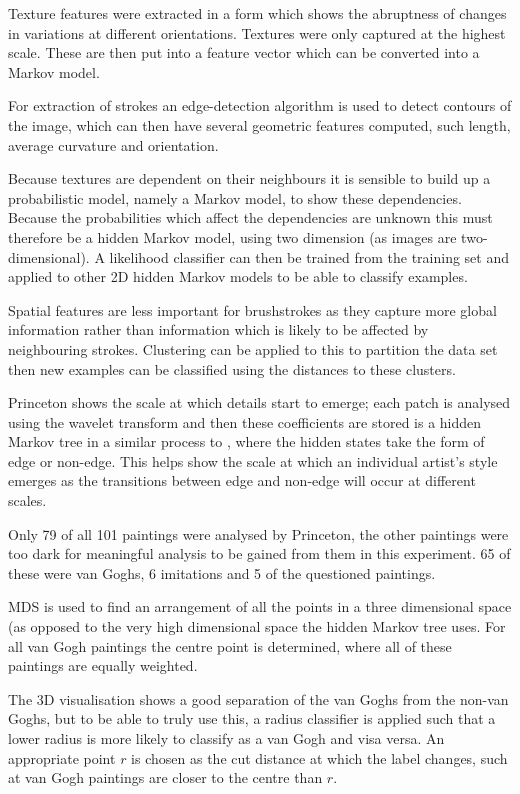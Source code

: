 \documentclass[conference]{IEEEtran}
\begin{document}
Texture features were extracted in a form which shows the abruptness of changes
in variations at different orientations. Textures were only captured at the
highest scale. These are then put into a feature vector which can be converted
into a Markov model.

For extraction of strokes an edge-detection algorithm is used to detect
contours of the image, which can then have several geometric features computed,
such length, average curvature and orientation.

Because textures are dependent on their neighbours it is sensible to build up a
probabilistic model, namely a Markov model, to show these dependencies. Because
the probabilities which affect the dependencies are unknown this must therefore
be a hidden Markov model, using two dimension (as images are two-dimensional).
A likelihood classifier can then be trained from the training set and applied
to other 2D hidden Markov models to be able to classify examples.

Spatial features are less important for brushstrokes as they capture more
global information rather than information which is likely to be affected by
neighbouring strokes. Clustering can be applied to this to partition the data
set then new examples can be classified using the distances to these clusters.

Princeton shows the scale at which details start to emerge; each patch is
analysed using the wavelet transform and then these coefficients are stored is
a hidden Markov tree in a similar process to \cite{jafarpour2009stylistic},
where the hidden states take the form of edge or non-edge. This helps show the
scale at which an individual artist's style emerges as the transitions between
edge and non-edge will occur at different scales.

Only 79 of all 101 paintings were analysed by Princeton, the other paintings
were too dark for meaningful analysis to be gained from them in this
experiment. 65 of these were van Goghs, 6 imitations and 5 of the questioned
paintings.

\gls{MDS} is used to find an arrangement of all the points in a three
dimensional space (as opposed to the very high dimensional space the hidden
Markov tree uses. For all van Gogh paintings the centre point is determined,
where all of these paintings are equally weighted.

The 3D visualisation shows a good separation of the van Goghs from the non-van
Goghs, but to be able to truly use this, a radius classifier is applied such
that a lower radius is more likely to classify as a van Gogh and visa versa. An
appropriate point $r$ is chosen as the cut distance at which the label changes,
such at van Gogh paintings are closer to the centre than $r$.
\end{document}
